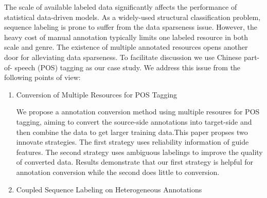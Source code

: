 \begin{eabstract}


    The scale of available labeled data significantly affects the performance of statistical data-driven models. As a widely-used structural classification problem, sequence labeling is prone to suffer from the data sparseness issue.
    However, the heavy cost of manual annotation typically limits one labeled resource in both scale and genre.
    The existence of multiple annotated resources opens another door for alleviating data sparseness.
    To facilitate discussion we use Chinese part-of- speech (POS) tagging as our case study.
    We address this issue from the following points of view:

    \begin{enumerate}
        \item Conversion of Multiple Resources for POS Tagging

              We propose a annotation conversion method using multiple resoures for POS tagging, aiming to
              convert the source-side annotations into target-side and then combine the data to get larger training data.This paper propses two innovate strategies. The first strategy uses reliability information of guide features. The second strategy uses ambiguous labelings to improve the quality of converted data. Results demonstrate that our first strategy is helpful for annotation conversion while the second does little to conversion.

        \item Coupled Sequence Labeling on Heterogeneous Annotations


\end{enumerate}
\end{eabstract}
